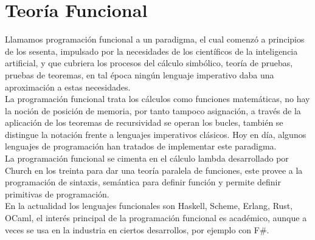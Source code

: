 
\chapter{Teoría Funcional}

Llamamos programación funcional a un paradigma, el cual comenzó a principios de los sesenta, impulsado por la necesidades de los científicos de la inteligencia artificial, y que cubriera los procesos del cálculo simbólico, teoría de pruebas, pruebas de teoremas, en tal época ningún lenguaje imperativo daba una aproximación a estas necesidades.\\
La programación funcional trata los cálculos como funciones matemáticas, no hay la noción de posición de memoria, por tanto tampoco asignación, a través de la aplicación de los teoremas de recursividad se operan los bucles, también se distingue la notación frente a lenguajes imperativos clásicos. Hoy en día, algunos lenguajes de programación han tratados de implementar este paradigma.\\
La programación funcional se cimenta en el cálculo lambda desarrollado por Church en los treinta para dar una teoría paralela de funciones, este provee a la programación de sintaxis, semántica para definir función y permite definir primitivas de programación.\\
En la actualidad los lenguajes funcionales son Haskell, Scheme, Erlang, Rust, OCaml, el interés principal de la programación funcional es académico, aunque a veces se usa en la industria en ciertos desarrollos, por ejemplo con F#.
